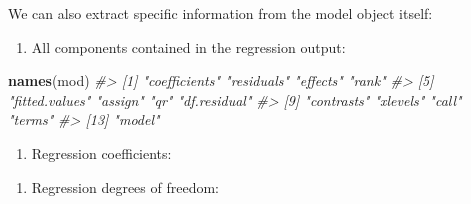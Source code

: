 \documentclass[
]{book}
\newenvironment{Shaded}{\begin{snugshade}}{\end{snugshade}}
\newcommand{\CommentTok}[1]{\textcolor[rgb]{0.56,0.35,0.01}{\textit{#1}}}
\newcommand{\KeywordTok}[1]{\textcolor[rgb]{0.13,0.29,0.53}{\textbf{#1}}}
\newcommand{\NormalTok}[1]{#1}
\newcommand{\OperatorTok}[1]{\textcolor[rgb]{0.81,0.36,0.00}{\textbf{#1}}}
\providecommand{\tightlist}{%
  \setlength{\itemsep}{0pt}\setlength{\parskip}{0pt}}
\begin{document}
We can also extract specific information from the model object itself:

\begin{enumerate}
\def\labelenumi{\arabic{enumi}.}
\tightlist
\item
  All components contained in the regression output:
\end{enumerate}

\begin{Shaded}
\begin{Highlighting}[]
\KeywordTok{names}\NormalTok{(mod)}
\CommentTok{#>  [1] "coefficients"  "residuals"     "effects"       "rank"         }
\CommentTok{#>  [5] "fitted.values" "assign"        "qr"            "df.residual"  }
\CommentTok{#>  [9] "contrasts"     "xlevels"       "call"          "terms"        }
\CommentTok{#> [13] "model"}
\end{Highlighting}
\end{Shaded}

\begin{enumerate}
\def\labelenumi{\arabic{enumi}.}
\setcounter{enumi}{1}
\tightlist
\item
  Regression coefficients:
\end{enumerate}

\begin{Shaded}
\end{Shaded}

\begin{enumerate}
\def\labelenumi{\arabic{enumi}.}
\setcounter{enumi}{2}
\tightlist
\item
  Regression degrees of freedom:
\end{enumerate}

\begin{Shaded}
\end{Shaded}
\end{document}
